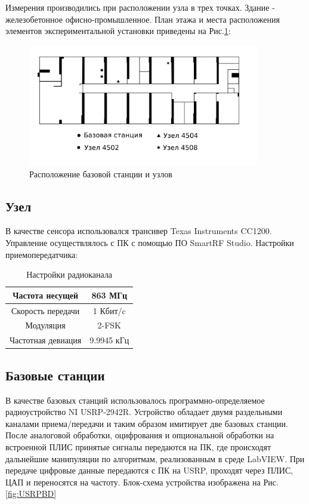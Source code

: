 \documentclass[a4paper,12pt,oneside]{scrartcl}
\begin{document}
Измерения производились при расположении узла в трех точках. Здание - железобетонное офисно-промышленное.
План этажа и места расположения элементов экспериментальной установки приведены на Рис.\ref{fig:StagePlan}:
 
\begin{figure}[!htb]
    \centering
    \includegraphics[width=0.9\textwidth]{pics/plan.png}
    \caption{Расположение базовой станции и узлов}
    \label{fig:StagePlan}
\end{figure}

\subsection{Узел}

В качестве сенсора использовался трансивер Texas Instruments CC1200. 
Управление осуществлялось с ПК с помощью ПО SmartRF Studio. 
Настройки приемопередатчика:

\begin{table}[htb!]
\centering
\caption{Настройки радиоканала}
\label{table:ccconfig}
\begin{tabular}{|c|c|}
\hline
Частота несущей & 863 МГц \\
\hline
Скорость передачи & 1 Кбит/c \\
\hline
Модуляция & 2-FSK\\
\hline
Частотная девиация & 9.9945 кГц\\
\hline
\end{tabular}
\end{table}

\subsection{Базовые станции}

В качестве базовых станций использовалось программно-определяемое радиоустройство NI USRP-2942R. Устройство обладает двумя раздельными каналами приема/передачи и таким образом имитирует две базовых станции. 
После аналоговой обработки, оцифрования и опциональной обработки на встроенной ПЛИС принятые сигналы передаются на ПК, где происходят дальнейшие манипуляции по алгоритмам, реализованным в среде LabVIEW. 
При передаче цифровые данные передаются с ПК на USRP, проходят через ПЛИС, ЦАП и переносятся на частоту. 
Блок-схема устройства изображена на Рис.\ref{fig:USRPBD}
\end{document}
